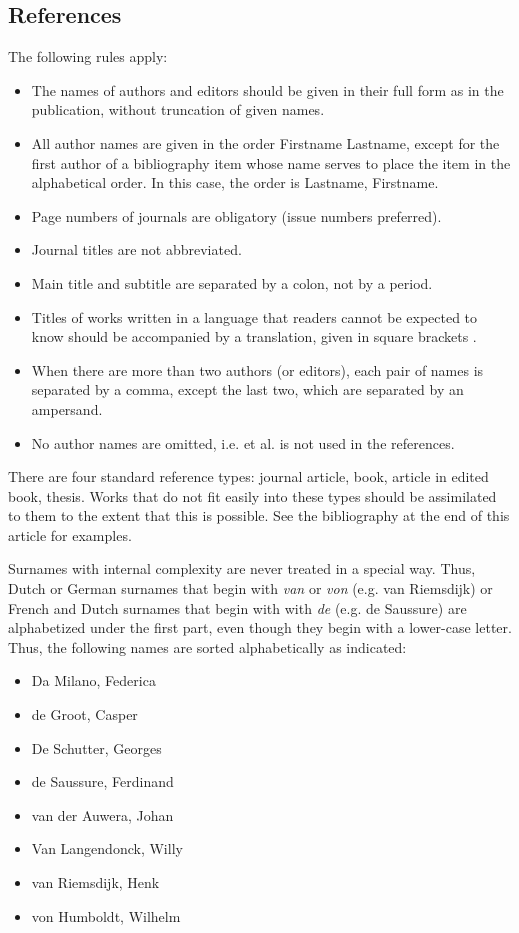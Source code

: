 \documentclass[charis,linguex]{glossa}
\begin{document}
\subsection{References}

The following rules apply:

\begin{itemize}
\item The names of authors and editors should be given in their full form as in the publication, without truncation of given names.
\item All author names are given in the order Firstname Lastname, except for the first author of a bibliography item whose name serves to place the item in the alphabetical order. In this case, the order is Lastname, Firstname.
\item Page numbers of journals are obligatory (issue numbers preferred).
\item Journal titles are not abbreviated.
\item Main title and subtitle are separated by a colon, not by a period.
\item Titles of works written in a language that readers cannot be expected to know should be accompanied by a translation, given in square brackets \citep{Li1999}.
\item When there are more than two authors (or editors), each pair of names is separated by a comma, except the last two, which are separated by an ampersand. 
\item No author names are omitted, i.e. et al. is not used in the references.
\end{itemize}

There are four standard reference types: journal article, book, article in edited book, thesis. Works that do not fit easily into these types should be assimilated to them to the extent that this is possible. See the bibliography at the end of this article for examples.

Surnames with internal complexity are never treated in a special way. Thus, Dutch or German surnames that begin with \textit{van} or \textit{von} (e.g. van Riemsdijk) or French and Dutch surnames that begin with with \textit{de} (e.g. de Saussure) are alphabetized under the first part, even though they begin with a lower-case letter. Thus, the following names are sorted alphabetically as indicated:

\begin{itemize}
\item Da Milano, Federica
\item de Groot, Casper
\item De Schutter, Georges
\item de Saussure, Ferdinand
\item van der Auwera, Johan
\item Van Langendonck, Willy
\item van Riemsdijk, Henk
\item von Humboldt, Wilhelm
\end{itemize}
\end{document}
